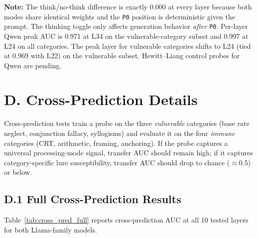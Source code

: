 \documentclass[accepted]{article}
\newcommand{\pzero}{\texttt{P0}}
\begin{document}
\noindent \textbf{Note:} The think/no-think difference is exactly
0.000 at every layer because both modes share identical weights and
the \pzero{} position is deterministic given the prompt.  The thinking
toggle only affects generation behavior \emph{after} \pzero{}.  Per-layer
Qwen peak AUC is 0.971 at L34 on the vulnerable-category subset and
0.997 at L24 on all categories.  The peak layer for vulnerable categories
shifts to L24 (tied at 0.969 with L22) on the vulnerable subset.
Hewitt--Liang control probes for Qwen are pending.


\section*{D. Cross-Prediction Details}
\label{sec:appendix_cross}

Cross-prediction tests train a probe on the three \emph{vulnerable}
categories (base rate neglect, conjunction fallacy, syllogisms) and
evaluate it on the four \emph{immune} categories (CRT, arithmetic,
framing, anchoring).  If the probe captures a universal
processing-mode signal, transfer AUC should remain high; if it
captures category-specific lure susceptibility, transfer AUC should
drop to chance ($\approx$0.5) or below.

\subsection*{D.1 Full Cross-Prediction Results}

Table~\ref{tab:cross_pred_full} reports cross-prediction AUC at all
10 tested layers for both Llama-family models.
\end{document}
